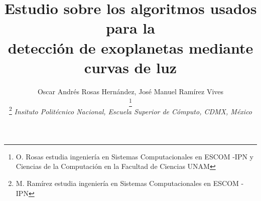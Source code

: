 \documentclass[fleqn, journal]{IEEEtran}                        %
\begin{document}
\title{Estudio sobre los algoritmos usados para la \\ detección de exoplanetas mediante curvas de luz}

\author{
    Oscar Andrés Rosas Hernández,
    José Manuel Ramírez Vives

    \thanks {
        O. Rosas estudia ingeniería en Sistemas Computacionales en ESCOM -IPN y Ciencias de
        la Computación en la Facultad de Ciencias UNAM
    }
    
    \thanks {
        M. Ramírez estudia ingeniería en Sistemas Computacionales en ESCOM -IPN
    }
    \textit{
        Insituto Politécnico Nacional, Escuela Superior de Cómputo, CDMX, México
    }
}



\maketitle
\end{document}

